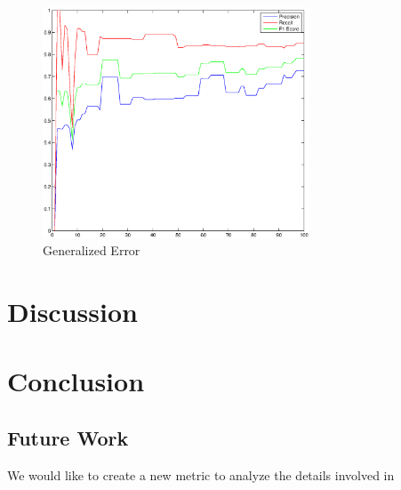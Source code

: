 \documentclass[12pt]{article}
\begin{document}
\begin{figure}
	\centering
	\includegraphics[width=300px]{precisionrecall}
	\caption{Generalized Error}
	\label{fig:precisionrecall}
\end{figure}

\section{Discussion}

\section{Conclusion}

\subsection{Future Work}

We would like to create a new metric to analyze the details involved in 
\end{document}
